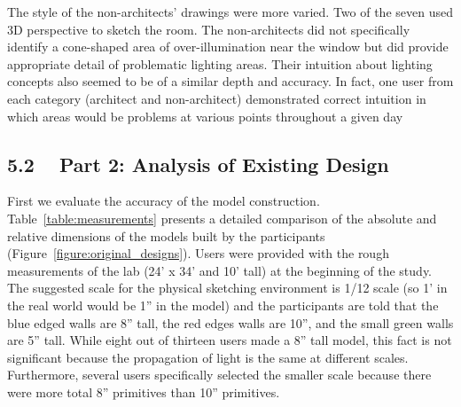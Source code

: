 \documentclass{article}
\begin{document}
The style of the non-architects' drawings were more varied. Two of the
seven used 3D perspective to sketch the room.  The non-architects did
not specifically identify a cone-shaped area of over-illumination near
the window but did provide appropriate detail of problematic lighting
areas.  Their intuition about lighting concepts also seemed to be of a
similar depth and accuracy.  In fact, one user from each category
(architect and non-architect) demonstrated correct intuition in which
areas would be problems at various points throughout a given day




\subsection{5.2 ~ Part 2: Analysis of Existing Design}

First we evaluate the accuracy of the model construction.
Table~\ref{table:measurements} presents a detailed comparison of the
absolute and relative dimensions of the models built by the
participants (Figure~\ref{figure:original_designs}).
%
Users were provided with the rough measurements of the lab (24' x 34'
and 10' tall) at the beginning of the study.  The suggested scale for
the physical sketching environment is 1/12 scale (so 1' in the real
world would be 1'' in the model) and the participants are told that
the blue edged walls are 8'' tall, the red edges walls are 10'', and
the small green walls are 5'' tall.
%
While eight out of thirteen users made a 8'' tall model, this fact is
not significant because the propagation of light is the same at
different scales.  Furthermore, several users specifically selected
the smaller scale because there were more total 8'' primitives than
10'' primitives.
%
\end{document}
